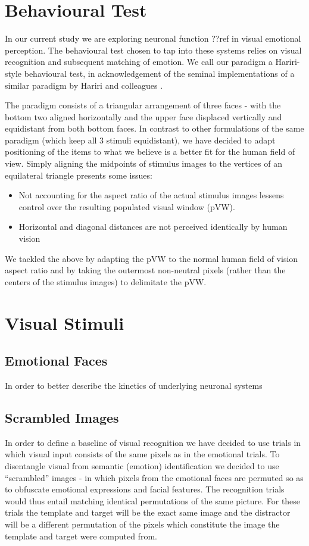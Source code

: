     \section{Behavioural Test}
    In our current study we are exploring neuronal function ??ref in visual emotional perception.
    The behavioural test chosen to tap into these systems relies on visual recognition and subsequent matching of emotion.
    We call our paradigm a Hariri-style behavioural test, in acknowledgement of the seminal implementations of a similar paradigm by Hariri and colleagues \cite{Hariri2000,Hariri2003}.
        
    The paradigm consists of a triangular arrangement of three faces - with the bottom two aligned horizontally and the upper face displaced vertically and equidistant from both bottom faces.
    In contrast to other formulations\cite{Hariri2000,Hariri2003} of the same paradigm (which keep all 3 stimuli equidistant),
    we have decided to adapt positioning of the items to what we believe is a better fit for the human field of view.
    Simply aligning the midpoints of stimulus images to the vertices of an equilateral triangle presents some issues:
    \begin{itemize}
        \item Not accounting for the aspect ratio of the actual stimulus images lessens control over the resulting populated visual window (pVW).
	\item Horizontal and diagonal distances are not perceived identically by human vision 
    \end{itemize}
    We tackled the above by adapting the pVW to the normal human field of vision aspect ratio and by taking the outermost non-neutral pixels (rather than the centers of the stimulus images) to delimitate the pVW.
    
    \section{Visual Stimuli}
	\subsection{Emotional Faces}\label{sec:m_vs_ef}
	
	In order to better describe the kinetics of underlying neuronal systems 
	\subsection{Scrambled Images}\label{sec:m_vs_si}
	In order to define a baseline of visual recognition we have decided to use trials in which visual input consists of the same pixels as in the emotional trials. 
	To disentangle visual from semantic (emotion) identification we decided to use “scrambled” images - in which pixels from the emotional faces are permuted so as to obfuscate emotional expressions and facial features.
	The recognition trials would thus entail matching identical permutations of the same picture.
	For these trials the template and target will be the exact same image and the distractor will be a different permutation of the pixels which constitute the image the template and target were computed from. 
	
